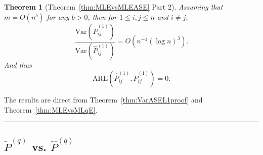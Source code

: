 \documentclass[a4paper]{article}
\newenvironment{proof}{{\bf Proof:  }}{\hfill\rule{2mm}{2mm}}
\newtheorem{theorem}[fact]{Theorem}
\renewcommand{\hat}{\widehat}
\begin{document}
\begin{theorem}[Theorem~\ref{thm:MLEvsMLEASE} Part 2]
\label{thm:AREL1proof}
Assuming that $m = O(n^b)$ for any $b > 0$,  then for $1 \le i, j \le n$ and $i \ne j$,
\[
	\frac{\mathrm{Var}(\widetilde{P}_{ij}^{(1)})}{\mathrm{Var}(\hat{P}_{ij}^{(1)})}
    = O(n^{-1} (\log n)^3).
\]
And thus
\[
	\mathrm{ARE}(\hat{P}_{ij}^{(1)}, \widetilde{P}_{ij}^{(1)}) = 0.
\]
\end{theorem}
\begin{proof}
The results are direct from Theorem~\ref{thm:VarASEL1proof} and Theorem~\ref{thm:MLEvsMLqE}.
\end{proof}







\subsection{$\widetilde{P}^{(q)}$ vs. $\hat{P}^{(q)}$}
\label{section:pf_MLqEASEvsMLqE}
\end{document}
